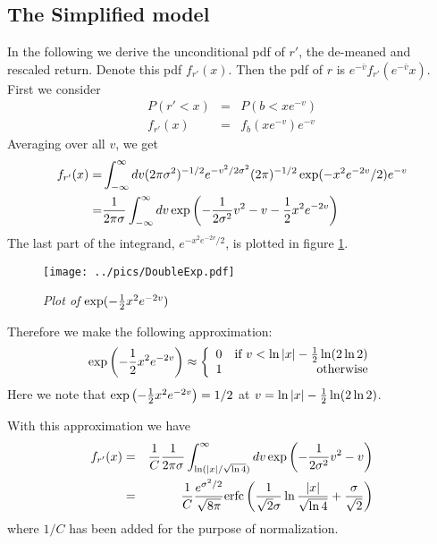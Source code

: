 \subsection{The Simplified model}\label{sec:SLV_Symmetric}
In the following we derive the unconditional \gls{pdf} of $r'$, the
de-meaned and rescaled return. Denote this \gls{pdf} $f_{r'}(x)$. Then
the \gls{pdf} of $r$ is $e^{-\bar{v}}f_{r'}(e^{-\bar{v}}x)$. First we
consider
\begin{eqnarray*}
  P(r' < x) &=& P(b < xe^{-v}) \\
  f_{r'}(x) &=& f_b(xe^{-v}) e^{-v}
\end{eqnarray*}
Averaging over all $v$, we get
\begin{equation}\label{eq:UncondPDFSymmetric}
  \begin{aligned}
    f_{r'}(x) =& \int_{-\infty}^{\infty} dv (2\pi\sigma^2)^{-1/2}
    e^{-v^2/2\sigma^2}(2\pi)^{-1/2} \exp(-x^2e^{-2v}/2) e^{-v} \\
    =& {1 \over 2\pi\sigma} \int_{-\infty}^{\infty} dv
    \exp\left(
      -{1 \over 2\sigma^2} v^2 - v -{1 \over 2} x^2 e^{-2v}
    \right)
  \end{aligned}
  \end{equation}
The last part of the integrand, $e^{-x^2 e^{-2v} / 2}$, is plotted in
figure \ref{fig:DoubleExp}.
\begin{figure}[htb!]
  \centering
  \texttt{[image: ../pics/DoubleExp.pdf]}
  \caption{\small \it Plot of $\exp(-{1 \over 2} x^2 e^{-2v})$}
  \label{fig:DoubleExp}
\end{figure}
Therefore we make the following approximation:
\[
\exp\left(-{1 \over 2} x^2 e^{-2v}\right) \approx \left\{
  \begin{array}{lr}
    0 & \text{if } v < \ln|x| -{1 \over 2} \ln(2\ln 2) \\
    1 & \text{otherwise}
  \end{array}
\right.
\]
Here we note that $\exp\left(-{1 \over 2} x^2 e^{-2v}\right) = 1/2$ at
$v = \ln|x| -{1 \over 2} \ln(2\ln 2)$.

With this approximation we have
\begin{eqnarray*}
  f_{r'}(x) &=& {1\over C}{1 \over 2\pi\sigma} \int_{\ln(|x|/\sqrt{\ln
      4})}^{\infty} dv
  \exp\left(-{1 \over 2\sigma^2} v^2 - v\right) \\
  &=& {1\over C}{e^{\sigma^2 / 2} \over \sqrt{8\pi}} \text{erfc} \left(
    {1 \over \sqrt{2}\sigma} \ln{|x| \over \sqrt{\ln 4}} + {\sigma
      \over \sqrt{2}}
  \right)
\end{eqnarray*}
where $1/C$ has been added for the purpose of normalization.

